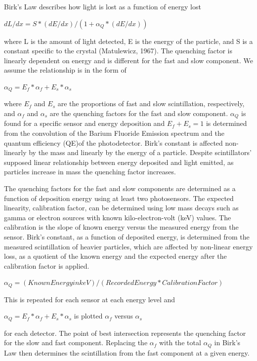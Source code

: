 \documentclass{article}
\begin{document}
Birk's Law describes how light is lost as a function of energy lost  

\noindent
$ dL/dx = S * (dE/dx)/(1 + \alpha_Q * (dE/dx)) $

where L is the amount of light detected, E is the energy of the particle, and S is a constant specific to the crystal (Matulewicz, 1967). The quenching factor is linearly dependent on energy and is different for the fast and slow component. We assume the relationship is in the form of 

\noindent
$\alpha_Q = E_f * \alpha_f + E_s * \alpha_s$ 

where $E_f$ and $E_s$ are the proportions of fast and slow scintillation, respectively, and $\alpha_f$ and $\alpha_s$ are the quenching factors for the fast and slow component. $\alpha_Q$ is found for a specific sensor and energy deposition and $E_f + E_s = 1$ is determined from the convolution of the Barium Fluoride Emission spectrum and the quantum efficiency (QE)of the photodetector. Birk's constant is affected non-linearly by the mass and linearly by the energy of a particle. Despite scintillators' supposed linear relationship between energy deposited and light emitted, as particles increase in mass the quenching factor increases. 

The quenching factors for the fast and slow components are determined as a function of deposition energy using at least two photosensors. The expected linearity, calibration factor, can be determined using low mass decays such as gamma or electron sources with known kilo-electron-volt (keV) values. The calibration is the slope of known energy versus the measured energy from the sensor. Birk's constant, as a function of deposited energy, is determined from the measured scintillation of heavier particles, which are affected by non-linear energy loss, as a quotient of the known energy and the expected energy after the calibration factor is applied. 

\noindent
$ \alpha_Q = (Known Energy in keV) / (Recorded Energy * Calibration Factor) $ 

This is repeated for each sensor at each energy level and 

\noindent
$\alpha_Q = E_f * \alpha_f + E_s * \alpha_s$ is plotted $\alpha_f$ versus $\alpha_s$ 

for each detector. The point of best intersection represents the quenching factor for the slow and fast component. Replacing the $\alpha_f$ with the total $\alpha_Q$ in Birk's Law then determines the scintillation from the fast component at a given energy. 
\end{document}
